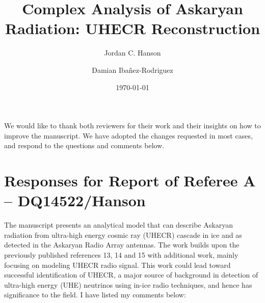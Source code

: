 \documentclass[amsmath,amssymb,aps,prd,10pt,twocolumn,showkeys]{revtex4}
\begin{document}
\title{Complex Analysis of Askaryan Radiation: UHECR Reconstruction}

\author{Jordan C. Hanson}
\author{Damian Iba\~{n}ez-Rodriguez}
\date{\today}


\maketitle

We would like to thank both reviewers for their work and their insights on how to improve the manuscript.  We have adopted the changes requested in most cases, and respond to the questions and comments below.

\section{Responses for Report of Referee A -- DQ14522/Hanson}

The manuscript presents an analytical model that can describe Askaryan radiation from ultra-high energy cosmic ray (UHECR) cascade in ice and as detected in the Askaryan Radio Array antennas. The work builds upon the previously published references 13, 14 and 15 with additional work, mainly focusing on modeling UHECR radio signal. This work could lead toward successful identification of UHECR, a major source of background in detection of ultra-high energy (UHE) neutrinos using in-ice radio techniques, and hence has significance to the field. I have listed my comments below:
\end{document}
